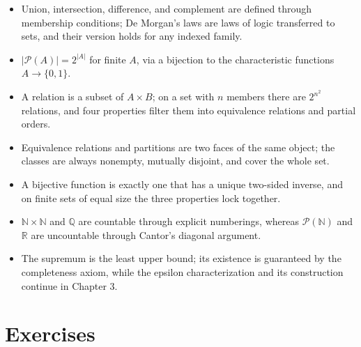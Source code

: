 \begin{ringkasan}
\begin{itemize}
  \item Union, intersection, difference, and complement are defined through
        membership conditions; De Morgan's laws are laws of logic transferred to
        sets, and their version holds for any indexed family.
  \item $|\mathcal{P}(A)| = 2^{|A|}$ for finite $A$, via a bijection to the
        characteristic functions $A \to \{0,1\}$.
  \item A relation is a subset of $A \times B$; on a set with $n$ members there are
        $2^{n^{2}}$ relations, and four properties filter them into equivalence
        relations and partial orders.
  \item Equivalence relations and partitions are two faces of the same object; the
        classes are always nonempty, mutually disjoint, and cover the whole set.
  \item A bijective function is exactly one that has a unique two-sided inverse, and
        on finite sets of equal size the three properties lock together.
  \item $\mathbb{N} \times \mathbb{N}$ and $\mathbb{Q}$ are countable through explicit
        numberings, whereas $\mathcal{P}(\mathbb{N})$ and $\mathbb{R}$ are uncountable
        through Cantor's diagonal argument.
  \item The supremum is the least upper bound; its existence is guaranteed by the
        completeness axiom, while the epsilon characterization and its construction
        continue in Chapter 3.
\end{itemize}
\end{ringkasan}

\section{Exercises}

